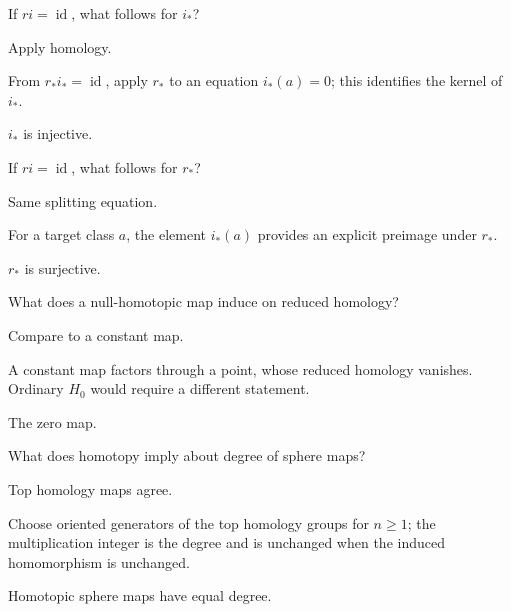 \begin{exercise}\label{exr:viii20-12}
If \(r i=\operatorname{id}\), what follows for \(i_*\)?
\end{exercise}
\begin{hint}
Apply homology.

From \(r_*i_*=\operatorname{id}\), apply \(r_*\) to an equation \(i_*(a)=0\); this identifies the kernel of \(i_*\).
\end{hint}
\begin{solution}
\(i_*\) is injective.
\end{solution}

\begin{exercise}\label{exr:viii20-13}
If \(r i=\operatorname{id}\), what follows for \(r_*\)?
\end{exercise}
\begin{hint}
Same splitting equation.

For a target class \(a\), the element \(i_*(a)\) provides an explicit preimage under \(r_*\).
\end{hint}
\begin{solution}
\(r_*\) is surjective.
\end{solution}

\begin{exercise}\label{exr:viii20-14}
What does a null-homotopic map induce on reduced homology?
\end{exercise}
\begin{hint}
Compare to a constant map.

A constant map factors through a point, whose reduced homology vanishes. Ordinary \(H_0\) would require a different statement.
\end{hint}
\begin{solution}
The zero map.
\end{solution}

\begin{exercise}\label{exr:viii20-15}
What does homotopy imply about degree of sphere maps?
\end{exercise}
\begin{hint}
Top homology maps agree.

Choose oriented generators of the top homology groups for \(n\ge1\); the multiplication integer is the degree and is unchanged when the induced homomorphism is unchanged.
\end{hint}
\begin{solution}
Homotopic sphere maps have equal degree.
\end{solution}

